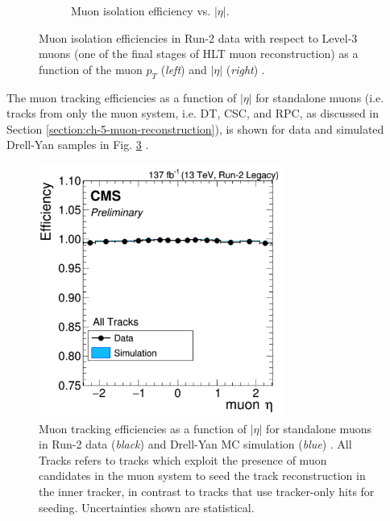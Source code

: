 \begin{figure}[h]
\begin{subfigure}{0.45\textwidth}
        \caption{Muon isolation efficiency vs. $|\eta|$.}
        \label{fig:muon_isolation_efficiency_vsEta}
    \end{subfigure}
    \caption[Muon isolation efficiencies in Run-2 data as a function of the muon $p_{T}$ (\textit{left}) and $|\eta|$ (\textit{right}).]{Muon isolation efficiencies in Run-2 data with respect to Level-3 muons (one of the final stages of HLT muon reconstruction) as a function of the muon $p_{T}$ (\textit{left}) and $|\eta|$ (\textit{right}) \cite{CMS-MUO-16-001}.} 
\end{figure}

The muon tracking efficiencies as a function of $|\eta|$ for standalone muons (i.e. tracks from only the muon system, i.e. DT, CSC, and RPC, as discussed in Section \ref{section:ch-5-muon-reconstruction}), is shown for data and simulated Drell-Yan samples in Fig. \ref{fig:muon_tracking_efficiency} \cite{CMS-DP-2020-035}. 

\begin{figure}[h]
    \centering
    \includegraphics[width=8cm]{figures/ch-8-scale-factors-and-corrections/muon_tracking_efficiency}
    \caption[Muon tracking efficiencies as a function of $|\eta|$ for standalone muons in Run-2 data (\textit{black}) and Drell-Yan (\textit{blue}) MC simulation.]{Muon tracking efficiencies as a function of $|\eta|$ for standalone muons in Run-2 data (\textit{black}) and Drell-Yan MC simulation (\textit{blue}) \cite{CMS-DP-2020-035}. All Tracks refers to tracks which exploit the presence of muon candidates in the muon system to seed the track reconstruction in the inner tracker, in contrast to tracks that use tracker-only hits for seeding. Uncertainties shown are statistical.}
    \label{fig:muon_tracking_efficiency}
\end{figure}



